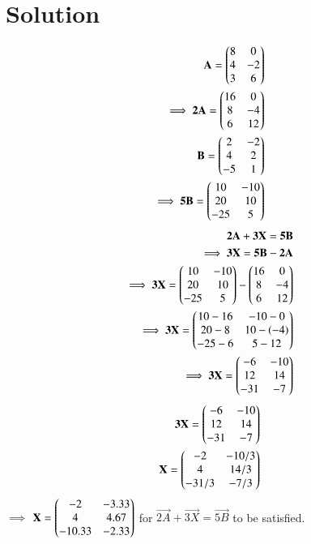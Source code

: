 \documentclass[journal,12pt,twocolumn]{IEEEtran}
\begin{document}
	\section{Solution}
	\begin{align}
		\mathbf{A}=\begin{pmatrix}8 & 0 \\ 4 & -2 \\ 3 & 6\end{pmatrix}\\
		\implies \mathbf{2A}=\begin{pmatrix}16 & 0 \\ 8 & -4 \\ 6 & 12\end{pmatrix}\\
		\mathbf{B}=\begin{pmatrix}2 & -2 \\ 4 & 2 \\ -5 & 1\end{pmatrix}\\
		\implies \mathbf{5B}=\begin{pmatrix}10 & -10 \\ 20 & 10 \\ -25 & 5\end{pmatrix}
	\end{align}
\begin{align}
	\mathbf{2A}+\mathbf{3X}=\mathbf{5B}\\
	\implies \mathbf{3X}=\mathbf{5B}-\mathbf{2A}\\
	\implies \mathbf{3X}=\begin{pmatrix}10 & -10 \\ 20 & 10 \\ -25 & 5\end{pmatrix}-\begin{pmatrix}16 & 0 \\ 8 & -4 \\ 6 & 12\end{pmatrix}\\
	\implies \mathbf{3X}=\begin{pmatrix}10-16 & -10-0 \\ 20-8 & 10-(-4) \\ -25-6 & 5-12\end{pmatrix}\\
	\implies \mathbf{3X}=\begin{pmatrix}-6 & -10 \\ 12 & 14 \\ -31 &-7\end{pmatrix}
\end{align}
\begin{align}
	\mathbf{3X}=\begin{pmatrix}-6 & -10 \\ 12 & 14 \\ -31 &-7\end{pmatrix}\\
	\mathbf{X}=\begin{pmatrix}-2 & -10/3 \\ 4 & 14/3 \\ -31/3 & -7/3\end{pmatrix}
\end{align}
$\implies$ $\mathbf{X}=\begin{pmatrix}-2 & -3.33 \\ 4 & 4.67 \\ -10.33 & -2.33\end{pmatrix}$ for $\vec{2A}+\vec{3X}=\vec{5B}$ to be satisfied.
\end{document}
